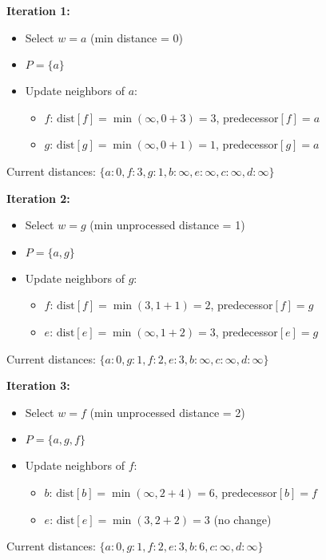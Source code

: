 \documentclass[12pt,a4paper]{article}
\begin{document}
\textbf{Iteration 1:}
\begin{itemize}
    \item Select $w = a$ (min distance = 0)
    \item $P = \{a\}$
    \item Update neighbors of $a$:
    \begin{itemize}
        \item $f$: $\text{dist}[f] = \min(\infty, 0 + 3) = 3$, predecessor$[f] = a$
        \item $g$: $\text{dist}[g] = \min(\infty, 0 + 1) = 1$, predecessor$[g] = a$
    \end{itemize}
\end{itemize}

Current distances: $\{a: 0, f: 3, g: 1, b: \infty, e: \infty, c: \infty, d: \infty\}$

\textbf{Iteration 2:}
\begin{itemize}
    \item Select $w = g$ (min unprocessed distance = 1)
    \item $P = \{a, g\}$
    \item Update neighbors of $g$:
    \begin{itemize}
        \item $f$: $\text{dist}[f] = \min(3, 1 + 1) = 2$, predecessor$[f] = g$
        \item $e$: $\text{dist}[e] = \min(\infty, 1 + 2) = 3$, predecessor$[e] = g$
    \end{itemize}
\end{itemize}

Current distances: $\{a: 0, g: 1, f: 2, e: 3, b: \infty, c: \infty, d: \infty\}$

\textbf{Iteration 3:}
\begin{itemize}
    \item Select $w = f$ (min unprocessed distance = 2)
    \item $P = \{a, g, f\}$
    \item Update neighbors of $f$:
    \begin{itemize}
        \item $b$: $\text{dist}[b] = \min(\infty, 2 + 4) = 6$, predecessor$[b] = f$
        \item $e$: $\text{dist}[e] = \min(3, 2 + 2) = 3$ (no change)
    \end{itemize}
\end{itemize}

Current distances: $\{a: 0, g: 1, f: 2, e: 3, b: 6, c: \infty, d: \infty\}$
\end{document}
